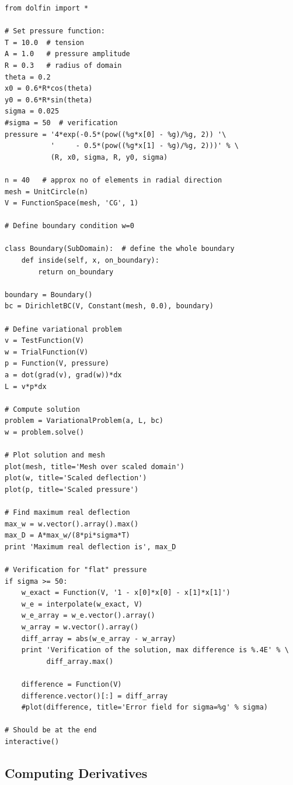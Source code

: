 \begin{Verbatim}[fontsize=\fontsize{10pt}{10pt},tabsize=8,baselinestretch=1.05,
fontfamily=tt,xleftmargin=7mm]
from dolfin import *

# Set pressure function:
T = 10.0  # tension
A = 1.0   # pressure amplitude
R = 0.3   # radius of domain
theta = 0.2
x0 = 0.6*R*cos(theta)
y0 = 0.6*R*sin(theta)
sigma = 0.025
#sigma = 50  # verification
pressure = '4*exp(-0.5*(pow((%g*x[0] - %g)/%g, 2)) '\
           '     - 0.5*(pow((%g*x[1] - %g)/%g, 2)))' % \
           (R, x0, sigma, R, y0, sigma)

n = 40   # approx no of elements in radial direction
mesh = UnitCircle(n)
V = FunctionSpace(mesh, 'CG', 1)

# Define boundary condition w=0

class Boundary(SubDomain):  # define the whole boundary
    def inside(self, x, on_boundary):
        return on_boundary

boundary = Boundary()
bc = DirichletBC(V, Constant(mesh, 0.0), boundary)

# Define variational problem
v = TestFunction(V)
w = TrialFunction(V)
p = Function(V, pressure)
a = dot(grad(v), grad(w))*dx
L = v*p*dx

# Compute solution
problem = VariationalProblem(a, L, bc)
w = problem.solve()

# Plot solution and mesh
plot(mesh, title='Mesh over scaled domain')
plot(w, title='Scaled deflection')
plot(p, title='Scaled pressure')

# Find maximum real deflection
max_w = w.vector().array().max()
max_D = A*max_w/(8*pi*sigma*T)
print 'Maximum real deflection is', max_D

# Verification for "flat" pressure
if sigma >= 50:
    w_exact = Function(V, '1 - x[0]*x[0] - x[1]*x[1]')
    w_e = interpolate(w_exact, V)
    w_e_array = w_e.vector().array()
    w_array = w.vector().array()
    diff_array = abs(w_e_array - w_array)
    print 'Verification of the solution, max difference is %.4E' % \
          diff_array.max()

    difference = Function(V)
    difference.vector()[:] = diff_array
    #plot(difference, title='Error field for sigma=%g' % sigma)

# Should be at the end
interactive()
\end{Verbatim}
\noindent



\subsection{Computing Derivatives}
\label{langtangen:poisson:gradu}


